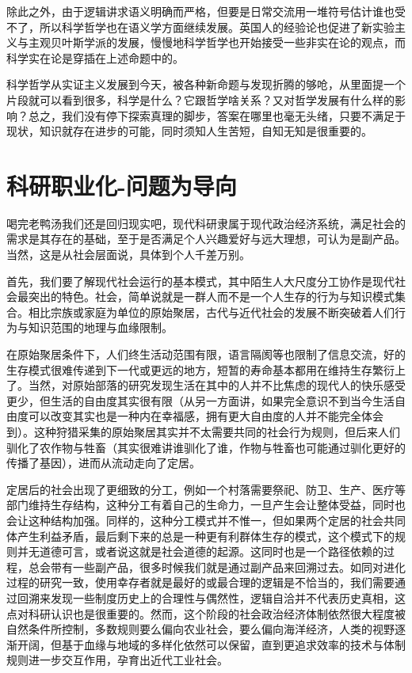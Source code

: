 \documentclass[]{book}
\begin{document}
除此之外，由于逻辑讲求语义明确而严格，但要是日常交流用一堆符号估计谁也受不了，所以科学哲学也在语义学方面继续发展。英国人的经验论也促进了新实验主义与主观贝叶斯学派的发展，慢慢地科学哲学也开始接受一些非实在论的观点，而科学实在论是穿插在上述命题中的。

科学哲学从实证主义发展到今天，被各种新命题与发现折腾的够呛，从里面提一个片段就可以看到很多，科学是什么？它跟哲学啥关系？又对哲学发展有什么样的影响？总之，我们没有停下探索真理的脚步，答案在哪里也毫无头绪，只要不满足于现状，知识就存在进步的可能，同时须知人生苦短，自知无知是很重要的。

\section{科研职业化-问题为导向}\label{-}

喝完老鸭汤我们还是回归现实吧，现代科研隶属于现代政治经济系统，满足社会的需求是其存在的基础，至于是否满足个人兴趣爱好与远大理想，可认为是副产品。当然，这是从社会层面说，具体到个人千差万别。

首先，我们要了解现代社会运行的基本模式，其中陌生人大尺度分工协作是现代社会最突出的特色。社会，简单说就是一群人而不是一个人生存的行为与知识模式集合。相比宗族或家庭为单位的原始聚居，古代与近代社会的发展不断突破着人们行为与知识范围的地理与血缘限制。

在原始聚居条件下，人们终生活动范围有限，语言隔阂等也限制了信息交流，好的生存模式很难传递到下一代或更远的地方，短暂的寿命基本都用在维持生存繁衍上了。当然，对原始部落的研究发现生活在其中的人并不比焦虑的现代人的快乐感受更少，但生活的自由度其实很有限（从另一方面讲，如果完全意识不到当今生活自由度可以改变其实也是一种内在幸福感，拥有更大自由度的人并不能完全体会到）。这种狩猎采集的原始聚居其实并不太需要共同的社会行为规则，但后来人们驯化了农作物与牲畜（其实很难讲谁驯化了谁，作物与牲畜也可能通过驯化更好的传播了基因），进而从流动走向了定居。

定居后的社会出现了更细致的分工，例如一个村落需要祭祀、防卫、生产、医疗等部门维持生存结构，这种分工有着自己的生命力，一旦产生会让整体受益，同时也会让这种结构加强。同样的，这种分工模式并不惟一，但如果两个定居的社会共同体产生利益矛盾，最后剩下来的总是一种更有利群体生存的模式，这个模式下的规则并无道德可言，或者说这就是社会道德的起源。这同时也是一个路径依赖的过程，总会带有一些副产品，很多时候我们就是通过副产品来回溯过去。如同对进化过程的研究一致，使用幸存者就是最好的或最合理的逻辑是不恰当的，我们需要通过回溯来发现一些制度历史上的合理性与偶然性，逻辑自洽并不代表历史真相，这点对科研认识也是很重要的。然而，这个阶段的社会政治经济体制依然很大程度被自然条件所控制，多数规则要么偏向农业社会，要么偏向海洋经济，人类的视野逐渐开阔，但基于血缘与地域的多样化依然可以保留，直到更追求效率的技术与体制规则进一步交互作用，孕育出近代工业社会。
\end{document}
